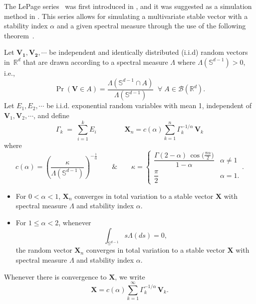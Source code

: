 The LePage series~\citep{SamorodnitskyGennady2000Snrp} was first introduced in \cite{LePageRaoul1981CtaS}, and it was suggested as a simulation method in \cite{Weron2004Computationally}. This series allows for simulating a multivariate stable vector with a stability index $\alpha$ and a given spectral measure through the use of the following theorem~\cite[Theorem 4]{BentkusV.2001LSRo}.
\begin{theorem}
\label{thm:spec2}
 Let $\mathbf{V_1},\mathbf{V_2},\cdots$ be independent and identically distributed (i.i.d) random vectors in~$\mathbb{R}^d$ that are drawn according to a spectral measure $\Lambda$ where $\Lambda(\mathbb{S}^{d-1})>0$, i.e.,
 \[
     \Pr(\mathbf{V}\in A)=\frac{\Lambda(\mathbb{S}^{d-1} ∩ A )}{\Lambda(\mathbb{S}^{d-1})} \;\;\forall\;A\in\mathcal{B}(\mathbb{R}^d).
 \]
 Let $E_1, E_2, \cdots$ be i.i.d. exponential random variables with mean 1, independent of  $\mathbf{V}_1, \mathbf{V}_2, \cdots$, and define
\begin{equation}
\label{LPseries}
\Gamma_k \;=\; \sum_{i=1}^k E_i \qquad
\qquad \mathbf{X}_n= c(\alpha)\sum_{k=1}^{n} \Gamma_k^{-1/\alpha}\,\mathbf{V}_k
\end{equation}
where  \[
c(\alpha)=\left(\frac{\kappa}{\Lambda(\mathbb{S}^{d-1})}\right)^{-\frac{1}{\alpha}} \qquad \& \qquad \kappa=\begin{cases}
\dfrac{\Gamma(2-\alpha)\,\cos\!\bigl(\tfrac{\pi\alpha}{2}\bigr)}{1-\alpha}
& \alpha\neq1\\
\dfrac{\pi}{2}
& \alpha=1.
\end{cases}.
\]
\begin{itemize}
\item[$\bullet$] For $0<\alpha<1$, $\mathbf{X}_n$ converges in total variation to a stable vector $\mathbf{X}$ with spectral measure $\Lambda$ and stability index $\alpha$.
\item[$\bullet$] For $1 \leq \alpha < 2$, whenever
\begin{equation}\label{eq:eq9}
\int_{\mathbb{S}^{d-1}}s\Lambda(ds)=0,
\end{equation}
the random vector $\mathbf{X}_n$ converges in total variation to a stable vector $\mathbf{X}$ with spectral measure $\Lambda$ and stability index $\alpha$.
\end{itemize}

Whenever there is convergence to $\mathbf{X}$, we write
\[
\mathbf{X}= c(\alpha)\sum_{k=1}^{\infty}\Gamma_k^{-1/\alpha}\,\mathbf{V}_k.
\]
\end{theorem}

